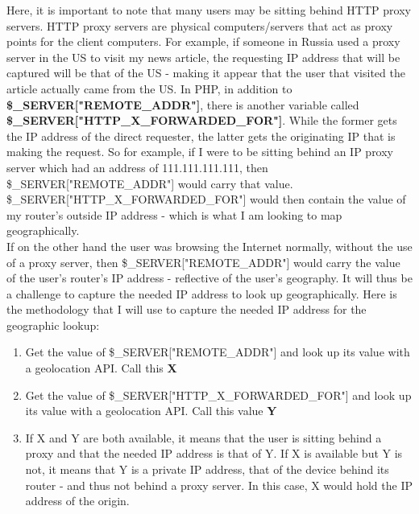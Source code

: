\documentclass[12pt]{article}
\begin{document}
Here, it is important to note that many users may be sitting behind HTTP proxy servers. HTTP proxy servers are physical computers/servers that act as proxy points for the client computers. For example, if someone in Russia used a proxy server in the US to visit my news article, the requesting IP address that will be captured will be that of the US - making it appear that the user that visited the article actually came from the US. In PHP, in addition to \textbf{\$\_SERVER["REMOTE\_ADDR"]}, there is another variable called \textbf{\$\_SERVER["HTTP\_X\_FORWARDED\_FOR"]}. While the former gets the IP address of the direct requester, the latter gets the originating IP that is making the request. So for example, if I were to be sitting behind an IP proxy server which had an address of 111.111.111.111, then \$\_SERVER["REMOTE\_ADDR"] would carry that value. \\
\$\_SERVER["HTTP\_X\_FORWARDED\_FOR"] would then contain the value of my router's outside IP address - which is what I am looking to map geographically.   
\\ If on the other hand the user was browsing the Internet normally, without the use of a proxy server, then \$\_SERVER["REMOTE\_ADDR"] would carry the value of the user's router's IP address - reflective of the user's geography. 
It will thus be a challenge to capture the needed IP address to look up geographically. Here is the methodology that I will use to capture the needed IP address for the geographic lookup:
\begin{enumerate}
\item Get the value of \$\_SERVER["REMOTE\_ADDR"] and look up its value with a geolocation API. Call this \textbf{X}
\item Get the value of \$\_SERVER["HTTP\_X\_FORWARDED\_FOR"] and look up its value with a geolocation API. Call this value \textbf{Y}
\item If X and Y are both available, it means that the user is sitting behind a proxy and that the needed IP address is that of Y. If X is available but Y is not, it means that Y is a private IP address, that of the device behind its router - and thus not behind a proxy server. In this case, X would hold the IP address of the origin.
\end{enumerate} 
\end{document}
